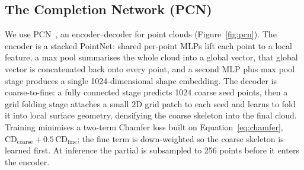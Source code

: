 \subsection{The Completion Network (PCN)}
\label{sec:completion-pcn}

We use PCN~\cite{yuan2019pcnpointcompletionnetwork}, an encoder--decoder for point clouds
(Figure~\ref{fig:pcn}). The encoder is a stacked PointNet: shared per-point MLPs
lift each point to a local feature, a max pool summarises the whole cloud into a
global vector, that global vector is concatenated back onto every point, and a
second MLP plus max pool stage produces a single \num{1024}-dimensional shape
embedding. The decoder is coarse-to-fine: a fully connected stage predicts
\num{1024} coarse seed points, then a grid folding stage attaches a small
2D grid patch to each seed and learns to fold it into local surface geometry,
densifying the coarse skeleton into the final cloud. Training minimises a
two-term Chamfer loss built on Equation~\eqref{eq:chamfer},
$\mathrm{CD}_{\text{coarse}} + 0.5\,\mathrm{CD}_{\text{fine}}$;
the fine term is down-weighted so the coarse skeleton is learned first. At
inference the partial is subsampled to \num{256} points before it enters the
encoder.

